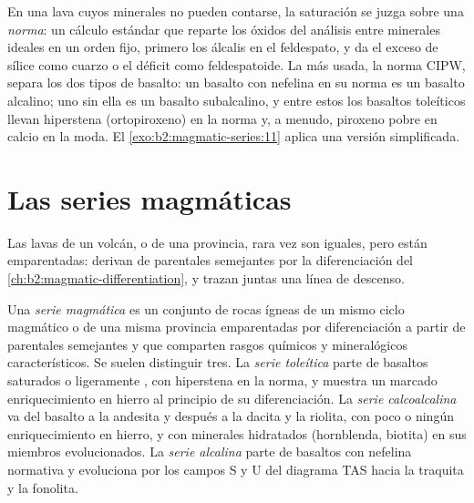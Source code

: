 En una lava cuyos minerales no pueden contarse, la saturación se juzga sobre una \emph{norma}: un
cálculo estándar que reparte los óxidos del análisis entre minerales ideales
en un orden fijo, primero los álcalis en el feldespato, y da el exceso de sílice como
cuarzo o el déficit como feldespatoide. La más usada, la norma CIPW, separa los
dos tipos de basalto: un basalto con nefelina en su norma es un basalto alcalino; uno
sin ella es un basalto subalcalino, y entre estos los basaltos toleíticos llevan
hiperstena (ortopiroxeno) en la norma y, a menudo, piroxeno pobre en calcio en la moda.
El \cref{exo:b2:magmatic-series:11} aplica una versión simplificada.

\section{Las series magmáticas}\label{sec:b2:magmatic-series:series}

Las lavas de un volcán, o de una provincia, rara vez son iguales, pero están emparentadas:
derivan de  parentales semejantes por la diferenciación del
\cref{ch:b2:magmatic-differentiation}, y trazan juntas una línea de descenso.

\begin{definition}\label{def:b2:magmatic-series:series}
Una \emph{serie magmática} es un conjunto de rocas ígneas de un mismo
ciclo magmático o de una misma provincia emparentadas por diferenciación a partir de  parentales semejantes y
que comparten rasgos químicos y mineralógicos característicos. Se suelen
distinguir tres. La \emph{serie toleítica} parte de
basaltos saturados o ligeramente , con hiperstena en la norma,
y muestra un marcado enriquecimiento en hierro al principio de su diferenciación. La
\emph{serie calcoalcalina} va del basalto a la
andesita y después a la dacita y la riolita, con poco o ningún enriquecimiento en hierro, y con
minerales hidratados (hornblenda, biotita) en sus miembros evolucionados. La \emph{serie
alcalina} parte de basaltos con nefelina normativa y evoluciona
por los campos S y U del diagrama TAS hacia la traquita y la fonolita.
\end{definition}

